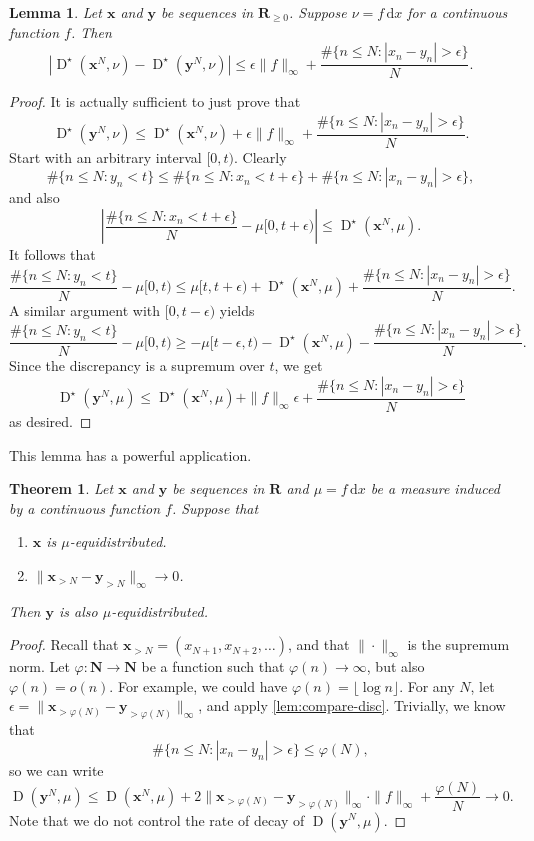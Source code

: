 \documentclass{article}
\DeclareMathOperator{\disc}{D}
\newcommand{\bN}{\mathbf{N}}
\newcommand{\bR}{\mathbf{R}}
\newcommand{\bx}{{\boldsymbol x}}
\newcommand{\by}{{\boldsymbol y}}
\newcommand{\dd}{\mathrm{d}}
\newtheorem{lemma}[subsection]{Lemma}
\newtheorem{theorem}[subsection]{Theorem}
\begin{document}
\begin{lemma}\label{lem:compare-disc}
Let $\bx$ and $\by$ be sequences in $\bR_{\geqslant 0}$. Suppose 
$\nu = f\, \dd x$ for a continuous function $f$. Then 
\[
	|\disc^\star(\bx^N,\nu) - \disc^\star(\by^N,\nu)| \leqslant \epsilon\|f\|_\infty + \frac{\# \{n\leqslant N : |x_n - y_n| > \epsilon\}}{N} .
\]
\end{lemma}
\begin{proof}
It is actually sufficient to just prove that 
\[
	\disc^\star(\by^N,\nu) \leqslant \disc^\star(\bx^N,\nu) + \epsilon \|f\|_\infty + \frac{\# \{n\leqslant N : |x_n - y_n| > \epsilon\}}{N} .
\]
Start with an arbitrary interval $[0,t)$. Clearly 
\[
	\# \{n\leqslant N : y_n < t\} \leqslant \# \{ n\leqslant N : x_n < t + \epsilon\} + \# \{n\leqslant N : |x_n - y_n| > \epsilon\} ,
\]
and also 
\[
	\left|\frac{\#\{n\leqslant N : x_n < t+\epsilon\}}{N} - \mu[0,t+\epsilon)\right| \leqslant \disc^\star(\bx^N,\mu) .
\]
It follows that 
\[
	\frac{\#\{n\leqslant N : y_n < t\}}{N} - \mu[0,t) \leqslant \mu[t,t+\epsilon) + \disc^\star(\bx^N,\mu) + \frac{\#\{n\leqslant N : |x_n - y_n| > \epsilon\}}{N} .
\]
A similar argument with $[0,t-\epsilon)$ yields 
\[
	\frac{\#\{n\leqslant N : y_n < t\}}{N} - \mu[0,t) \geqslant -\mu[t-\epsilon,t) - \disc^\star(\bx^N,\mu) - \frac{\#\{n\leqslant N : |x_n - y_n| > \epsilon\}}{N} .
\]
Since the discrepancy is a supremum over $t$, we get 
\[
	\disc^\star(\by^N,\mu) \leqslant \disc^\star(\bx^N,\mu) + \|f\|_\infty \epsilon + \frac{\#\{n\leqslant N : |x_n - y_n| > \epsilon\}}{N}
\]
as desired. 
\end{proof}

This lemma has a powerful application. 

\begin{theorem}\label{thm:two-discrepancies}
Let $\bx$ and $\by$ be sequences in $\bR$ and $\mu = f\, \dd x$ be a measure 
induced by a continuous function $f$. Suppose that 
\begin{enumerate}
\item
$\bx$ is $\mu$-equidistributed. 
\item
$\|\bx_{>N} - \by_{>N}\|_\infty \to 0$. 
\end{enumerate}
Then $\by$ is also $\mu$-equidistributed. 
\end{theorem}
\begin{proof}
Recall that $\bx_{>N} = (x_{N+1}, x_{N+2},\dots)$, and that $\|\cdot\|_\infty$ 
is the supremum norm. Let $\varphi:\bN \to \bN$ be a function such that 
$\varphi(n) \to \infty$, but also $\varphi(n) = o(n)$. For example, we could 
have $\varphi(n) = \lfloor \log n\rfloor$. For any $N$, let 
$\epsilon = \|\bx_{>\varphi(N)} - \by_{>\varphi(N)}\|_\infty$, and apply 
\autoref{lem:compare-disc}. Trivially, we know that 
\[
	\#\{n\leqslant N : |x_n - y_n| > \epsilon\} \leqslant \varphi(N) ,
\]
so we can write 
\[
	\disc(\by^N,\mu) \leqslant \disc(\bx^N,\mu) + 2 \|\bx_{> \varphi(N)} - \by_{> \varphi(N)}\|_\infty \cdot \|f\|_\infty + \frac{\varphi(N)}{N} \to 0 .
\]
Note that we do not control the rate of decay of $\disc(\by^N,\mu)$. 
\end{proof}
\end{document}
